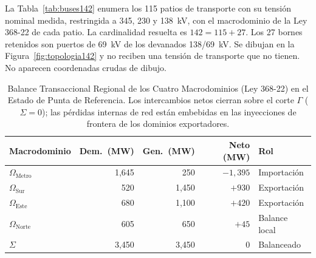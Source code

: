 La Tabla~\ref{tab:buses142} enumera los 115 patios de transporte con su tensión nominal medida, restringida a 345, 230 y 138~kV, con el macrodominio de la Ley 368-22 de cada patio. La cardinalidad resuelta es $142=115+27$. Los 27 bornes retenidos son puertos de 69~kV de los devanados 138/69~kV. Se dibujan en la Figura~\ref{fig:topologia142} y no reciben una tensión de transporte que no tienen. No aparecen coordenadas crudas de dibujo.

\begin{table}[!t]
\centering
\caption{Balance Transaccional Regional de los Cuatro Macrodominios (Ley 368-22) en el Estado de Punta de Referencia. Los intercambios netos cierran sobre el corte $\Gamma$ ($\Sigma = 0$); las pérdidas internas de red están embebidas en las inyecciones de frontera de los dominios exportadores.}
\label{tab:regbalance}
\footnotesize
\setlength{\tabcolsep}{3pt}
\begin{tabular}{@{}lrrrl@{}}
\toprule
\textbf{Macrodominio} & \textbf{Dem.\ (MW)} & \textbf{Gen.\ (MW)} & \textbf{Neto (MW)} & \textbf{Rol} \\
\midrule
$\Omega_{\mathrm{Metro}}$ & 1,645 & 250 & $-1{,}395$ & Importación \\
$\Omega_{\mathrm{Sur}}$ & 520 & 1,450 & $+930$ & Exportación \\
$\Omega_{\mathrm{Este}}$ & 680 & 1,100 & $+420$ & Exportación \\
$\Omega_{\mathrm{Norte}}$ & 605 & 650 & $+45$ & Balance local \\
\midrule
$\Sigma$ & 3,450 & 3,450 & $0$ & Balanceado \\
\bottomrule
\end{tabular}
\end{table}

